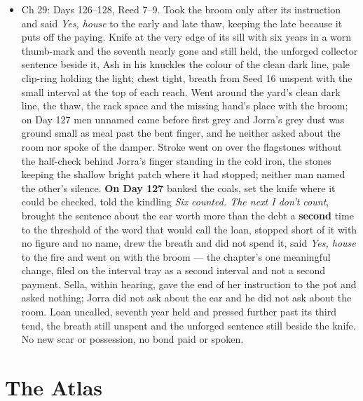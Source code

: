 \documentclass{design/chronicle}
\begin{document}
{\begin{itemize}[leftmargin=1.4em,itemsep=1pt,topsep=3pt,parsep=0pt]
\item Ch 29: Days 126–128, Reed 7–9. Took the broom only after its instruction and said \emph{Yes, house} to the early and late thaw, keeping the late because it puts off the paying. Knife at the very edge of its sill with six years in a worn thumb-mark and the seventh nearly gone and still held, the unforged collector sentence beside it, Ash in his knuckles the colour of the clean dark line, pale clip-ring holding the light; chest tight, breath from Seed 16 unspent with the small interval at the top of each reach. Went around the yard’s clean dark line, the thaw, the rack space and the missing hand’s place with the broom; on Day 127 men unnamed came before first grey and Jorra’s grey dust was ground small as meal past the bent finger, and he neither asked about the room nor spoke of the damper. Stroke went on over the flagstones without the half-check behind Jorra’s finger standing in the cold iron, the stones keeping the shallow bright patch where it had stopped; neither man named the other’s silence. \textbf{On Day 127} banked the coals, set the knife where it could be checked, told the kindling \emph{Six counted. The next I don’t count}, brought the sentence about the ear worth more than the debt a \textbf{second} time to the threshold of the word that would call the loan, stopped short of it with no figure and no name, drew the breath and did not spend it, said \emph{Yes, house} to the fire and went on with the broom — the chapter’s one meaningful change, filed on the interval tray as a second interval and not a second payment. Sella, within hearing, gave the end of her instruction to the pot and asked nothing; Jorra did not ask about the ear and he did not ask about the room. Loan uncalled, seventh year held and pressed further past its third tend, the breath still unspent and the unforged sentence still beside the knife. No new scar or possession, no bond paid or spoken.

\end{itemize}
}

\chapter*{The Atlas}
\end{document}
